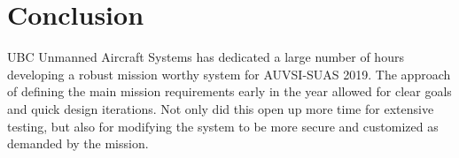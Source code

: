 \section{Conclusion}
UBC Unmanned Aircraft Systems has dedicated a large number of hours developing a robust mission worthy system for AUVSI-SUAS 2019. The approach of defining the main mission requirements early in the year allowed for clear goals and quick design iterations. Not only did this open up more time for extensive testing, but also for modifying the system to be more secure and customized as demanded by the mission. 